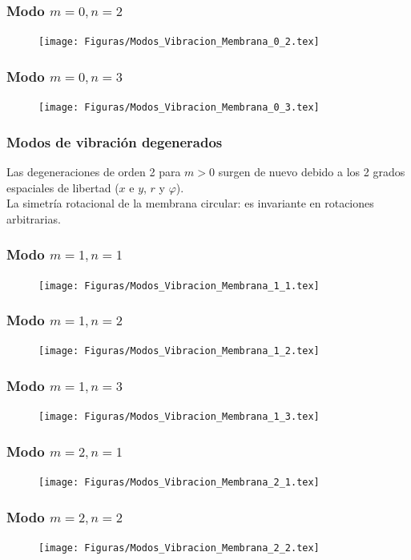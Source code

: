 \begin{frame}
\frametitle{Modo $m=0, n=2$}
\begin{figure}
    \centering
    \texttt{[image: Figuras/Modos\_Vibracion\_Membrana\_0\_2.tex]}
\end{figure}
\end{frame}
\begin{frame}
\frametitle{Modo $m=0, n=3$}
\begin{figure}
    \centering
    \texttt{[image: Figuras/Modos\_Vibracion\_Membrana\_0\_3.tex]}
\end{figure}
\end{frame}
\begin{frame}
\frametitle{Modos de vibración degenerados}
Las degeneraciones de orden 2 para $m > 0$ surgen de nuevo debido a los 2 grados espaciales de libertad ($x$ e $y$, $r$ y $\varphi$).
\\
\bigskip
La simetría rotacional de la membrana circular: es invariante en rotaciones arbitrarias.
\end{frame}
\begin{frame}
\frametitle{Modo $m=1, n=1$}
\begin{figure}
    \centering
    \texttt{[image: Figuras/Modos\_Vibracion\_Membrana\_1\_1.tex]}
\end{figure}
\end{frame}
\begin{frame}
\frametitle{Modo $m=1, n=2$}
\begin{figure}
    \centering
    \texttt{[image: Figuras/Modos\_Vibracion\_Membrana\_1\_2.tex]}
\end{figure}
\end{frame}
\begin{frame}
\frametitle{Modo $m=1, n=3$}
\begin{figure}
    \centering
    \texttt{[image: Figuras/Modos\_Vibracion\_Membrana\_1\_3.tex]}
\end{figure}
\end{frame}
\begin{frame}
\frametitle{Modo $m=2, n=1$}
\begin{figure}
\centering
\texttt{[image: Figuras/Modos\_Vibracion\_Membrana\_2\_1.tex]}
\end{figure}
\end{frame}
\begin{frame}
\frametitle{Modo $m=2, n=2$}
\begin{figure}
    \centering
    \texttt{[image: Figuras/Modos\_Vibracion\_Membrana\_2\_2.tex]}
\end{figure}
\end{frame}
